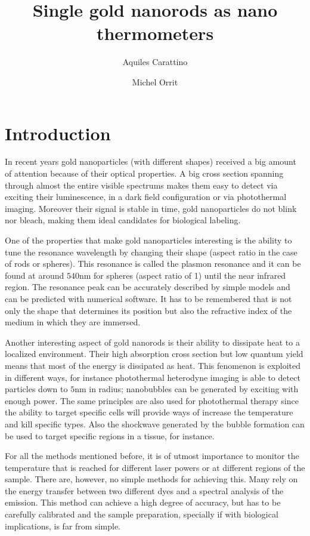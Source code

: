 \documentclass[twocolumn]{article}
\title{Single gold nanorods as nano thermometers}
\author{Aquiles Carattino \and Michel Orrit}
\begin{document}
\maketitle
{}

\section{Introduction}
In recent years gold nanoparticles (with different shapes) received a big
amount of attention because of their optical properties. A big cross section
spanning through almost the entire visible spectrums makes them easy to detect
via exciting their luminescence, in a dark field configuration or via
photothermal imaging. Moreover their signal is stable in time, gold
nanoparticles do not blink nor bleach, making them ideal candidates for
biological labeling. 

One of the properties that make gold nanoparticles interesting is the ability to
tune the resonance wavelength by changing their shape (aspect ratio in the case
of rods or spheres). This resonance is called the plasmon resonance and it can
be found at around $540$nm for spheres (aspect ratio of 1) until the near
infrared region. The resonance peak can be accurately described by simple models
and can be predicted with numerical software. It has to be remembered that is
not only the shape that determines its position but also the refractive index of
the medium in which they are immersed. 

Another interesting aspect of gold nanorods is their ability to dissipate heat
to a localized environment. Their high absorption cross section but low quantum
yield means that most of the energy is dissipated as heat. This fenomenon is
exploited in different ways, for instance photothermal heterodyne imaging is
able to detect particles down to $5$nm in radius; nanobubbles can be generated
by exciting with enough power. The same principles are also used for
photothermal therapy since the ability to target specific cells will provide
ways of increase the temperature and kill specific types. Also the shockwave
generated by the bubble formation can be used to target specific regions in a
tissue, for instance. 

For all the methods mentioned before, it is of utmost importance to monitor the
temperature that is reached for different laser powers or at different regions
of the sample. There are, however, no simple methods for achieving this. Many
rely on the energy transfer between two different dyes and a spectral analysis
of the emission. This method can achieve a high degree of accuracy, but has to
be carefully calibrated and the sample preparation, specially if with biological
implications, is far from simple. 
\end{document}
